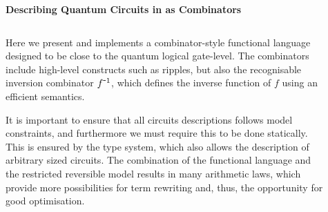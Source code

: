 \documentclass[final]{beamer}
\newlength{\sepwid}
\newlength{\onecolwid}
\newlength{\twocolwid}
\begin{document}
\begin{frame}[t]
\begin{columns}[t,onlytextwidth]
\begin{column}{\twocolwid}
\begin{columns}[t,onlytextwidth]
\begin{column}{\onecolwid}
\end{column} %

\end{columns}

\end{column} %

\end{columns} %



\vspace{20mm}
\textbf{\large Describing Quantum Circuits in \rfun as Combinators}

\begin{columns}[t,onlytextwidth] %

\begin{column}{\onecolwid} %

\begin{block}{}
  \vspace{-22mm}
Here we present and implements a combinator-style functional language designed to be close to the quantum logical gate-level. The combinators include high-level constructs such as ripples, but also the recognisable inversion combinator $f^{\mbox{-}1}$, which defines the inverse function of $f$ using an efficient semantics.

It is important to ensure that all circuits descriptions follows model constraints, and furthermore we must require this to be done statically. This is ensured by the type system, which also allows the description of arbitrary sized circuits. The combination of the functional language and the restricted reversible model results in many arithmetic laws, which provide more possibilities for term rewriting and, thus, the opportunity for good optimisation.
\end{block}

\end{column}

\begin{column}{\sepwid}~\end{column} %

\begin{column}{\onecolwid}


\end{column}
\end{columns}
\end{frame}
\end{document}
